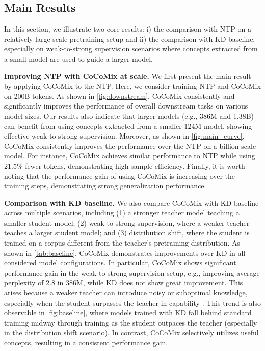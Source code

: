\documentclass[]{fairmeta}
\newcommand{\sname}{CoCoMix\xspace}
\begin{document}
\subsection{Main Results}
\label{sec:exp_main}

In this section, we illustrate two core results: i) the comparison with NTP on a relatively large-scale pretraining setup and ii) the comparison with KD baseline, especially on weak-to-strong supervision scenarios where concepts extracted from a small model are used to guide a larger model. 

\textbf{Improving NTP with \sname at scale.}
We first present the main result by applying \sname to the NTP. Here, we consider training NTP and \sname on 200B tokens. As shown in \autoref{fig:downstream}, \sname consistently and significantly improves the performance of overall downstream tasks on various model sizes. Our results also indicate that larger models (e.g., 386M and 1.38B) can benefit from using concepts extracted from a smaller 124M model, showing effective weak-to-strong supervision. Moreover, as shown in \autoref{fig:main_curve}, \sname consistently improves the performance over the NTP on a billion-scale model. For instance, \sname achieves similar performance to NTP while using 21.5\% fewer tokens, demonstrating high sample efficiency. Finally, it is worth noting that the performance gain of using \sname is increasing over the training steps, demonstrating strong generalization performance.

\textbf{Comparison with KD baseline.} We also compare \sname with KD baseline across multiple scenarios, including (1) a stronger teacher model teaching a smaller student model; (2) weak-to-strong supervision, where a weaker teacher teaches a larger student model; and (3) distribution shift, where the student is trained on a corpus different from the teacher’s pretraining distribution. As shown in \autoref{tab:baseline}, \sname demonstrates improvements over KD in all considered model configurations. In particular, \sname shows significant performance gain in the weak-to-strong supervision setup, e.g., improving average perplexity of 2.8 in 386M, while KD does not show great improvement. This arises because a weaker teacher can introduce noisy or suboptimal knowledge, especially when the student surpasses the teacher in capability \citep{rawat2024little}. This trend is also observable in \autoref{fig:baseline}, where models trained with KD fall behind standard training midway through training as the student outpaces the teacher (especially in the distribution shift scenario). In contrast, \sname selectively utilizes useful concepts, resulting in a consistent performance gain.
\end{document}
